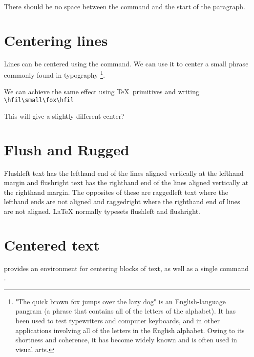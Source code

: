 There should be no space between the  command and
the start of the paragraph. 


\section{Centering lines}

Lines can be centered using the  command. We can use it to center a small phrase commonly found
in typography \footnote{"The quick brown fox jumps over the lazy dog" is an English-language pangram (a phrase that contains all of the letters of the alphabet). It has been used to test typewriters and computer keyboards, and in other applications involving all of the letters in the English alphabet. Owing to its shortness and coherence, it has become widely known and is often used in visual arts.}.

\noindent\centerline{\small\fox}

We can achieve the same effect using \TeX\  primitives  and writing \verb+\hfil\small\fox\hfil+
\medskip

{\hfil\small\fox\hfil}


This will give a slightly different center?

\section{Flush and Rugged}

Flushleft text has the lefthand end of the lines aligned vertically at the lefthand margin
and flushright text has the righthand end of the lines aligned vertically at the righthand
margin. The opposites of these are raggedleft text where the lefthand ends are not aligned
and raggedright where the righthand end of lines are not aligned. LaTeX normally typesets
flushleft and flushright.



{\small \begin{flushleft} \lorem \end{flushleft}}

{\small \begin{flushright} \lorem \end{flushright}}


\section{Centered text}
\latex provides an environment for centering blocks of text, as well as a single command . 

